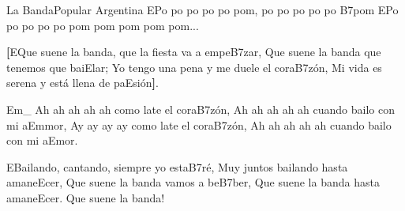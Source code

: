 \begin{musica}{La Banda}{Popular Argentina}{}
\ac{E}{Po} po po po po pom, po po po po po \ac{B7}{pom}
\ac{E}{Po} po po po po pom pom pom pom pom...

\textbf{[}\ac{E}{Que} suene la banda, que la fiesta va a empe\ac{B7}{zar},
Que suene la banda que tenemos que bai\ac{E}{lar};
Yo tengo una pena y me duele el cora\ac{B7}{zón},
Mi vida es serena y está llena de pa\ac{E}{sión}\textbf{]}. 

\ac{Em}{}_ Ah ah ah ah ah como late el cora\ac{B7}{zón},
Ah ah ah ah ah cuando bailo con mi a\ac{Em}{mor},
Ay ay ay ay como late el cora\ac{B7}{zón},
Ah ah ah ah ah cuando bailo con mi a\ac{E}{mor}.

\ac{E}{Bai}lando, cantando, siempre yo esta\ac{B7}{ré},
Muy juntos bailando hasta amane\ac{E}{cer},
Que suene la banda vamos a be\ac{B7}{ber},
Que suene la banda hasta amane\ac{E}{cer}.
Que suene la banda!

\end{musica}
